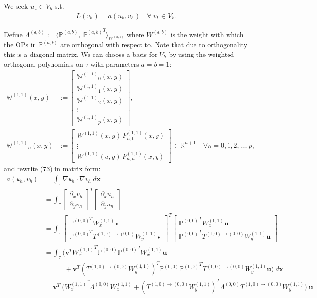 \documentclass[11pt, oneside]{article}   	%
\newcommand{\R}{\mathbb{R}}
\newcommand{\bigP}{\mathbb{P}}
\newcommand{\Wii}{W^{(1,1)}}
\newcommand{\Pii}{P^{(1,1)}}
\newcommand{\bigPoo}{{\mathbb{P}^{(0,0)}}}
\newcommand{\element}{\tau}
\newcommand{\bigWii}{{\mathbb{W}^{(1,1)}}}
\begin{document}
We seek $u_h \in V_h$ s.t.
\begin{align}
	L(v_h) = a(u_h,v_h) \quad \forall \: v_h \in V_h.
\end{align}

Define $\Lambda^{(a,b)} := \langle \bigP^{(a,b)}, \: {\bigP^{(a,b)}}^T \rangle_{W^{(a,b)}}$ where $W^{(a,b)}$ is the weight with which the OPs in $\bigP^{(a,b)}$ are orthogonal with respect to. Note that due to orthogonality this is a diagonal matrix. We can choose a basis for $V_h$ by using the weighted orthogonal polynomials on $\element$ with parameters $a = b = 1$:
\begin{align}
\bigWii(x,y) &:= \begin{bmatrix}
		\bigWii_0(x,y) \\
		\bigWii_1(x,y) \\
		\bigWii_2(x,y) \\
		\vdots \\
		\bigWii_p(x,y)
	\end{bmatrix}, \\
\bigWii_n(x,y) &:= \begin{bmatrix}
		\Wii(x,y) \: \Pii_{n,0}(x,y) \\
		\vdots \\
		\Wii(a,y) \: \Pii_{n,n}(x,y)
	\end{bmatrix} \in \R^{n+1} \quad \forall n = 0,1,2,\dots,p,
\end{align}
and rewrite (73) in matrix form:
\begin{align}
	a(u_h,v_h) &= \int_\element \nabla u_h \cdot \nabla v_h \: d\mathbf{x} \\
	&= \int_\element \begin{bmatrix}
					\partial_x v_h \\
					\partial_y v_h
				\end{bmatrix}^T 
				\begin{bmatrix}
					\partial_x u_h \\
					\partial_y u_h
				\end{bmatrix}
				\\
	&= \int_\element \begin{bmatrix}
					\bigPoo^T \Wii_x \mathbf{v} \\
					\bigPoo^T T^{(1,0)\to(0,0)} \Wii_y \mathbf{v}
				\end{bmatrix}^T 
				\begin{bmatrix}
					\bigPoo^T \Wii_x \mathbf{u} \\
					\bigPoo^T T^{(1,0)\to(0,0)} \Wii_y \mathbf{u}
				\end{bmatrix}
				\\
	&= \int_\element \Big( \mathbf{v}^T {\Wii_x}^T \bigPoo \bigPoo^T \Wii_x \mathbf{u} \nonumber \\
					& \quad \quad \quad + \mathbf{v}^T ({T^{(1,0)\to(0,0)} \Wii_y})^T \bigPoo \bigPoo^T T^{(1,0)\to(0,0)} \Wii_y \mathbf{u}  \Big) \: d\mathbf{x} \\
	&= \mathbf{v}^T \: \Big( {\Wii_x}^T \Lambda^{(0,0)} \Wii_x + ({T^{(1,0)\to(0,0)} \Wii_y})^T \Lambda^{(0,0)} T^{(1,0)\to(0,0)} \Wii_y \Big) \: \mathbf{u}
\end{align}
\end{document}
